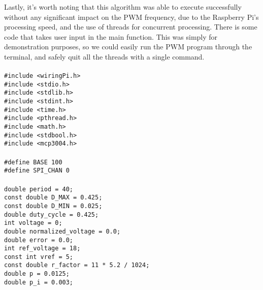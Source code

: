 \documentclass[a4paper, 12pt]{article}
\begin{document}
\begin{appendices}
	Lastly, it's worth noting that this algorithm was able to execute
	successfully without any significant impact on the PWM frequency, due
	to the Raspberry Pi's processing speed, and the use of threads for
	concurrent processing. There is some code that takes user input in the
	main function. This was simply for demonstration purposes, so we could
	easily run the PWM program through the terminal, and safely quit all
	the threads with a single command.\\\\\noindent
	\texttt{\#include <wiringPi.h>} \\\noindent
	\texttt{\#include <stdio.h>} \\\noindent
	\texttt{\#include <stdlib.h>} \\\noindent
	\texttt{\#include <stdint.h>} \\\noindent
	\texttt{\#include <time.h>} \\\noindent
	\texttt{\#include <pthread.h>} \\\noindent
	\texttt{\#include <math.h>} \\\noindent
	\texttt{\#include <stdbool.h>} \\\noindent
	\texttt{\#include <mcp3004.h>} \\\noindent
	\texttt{ \\\noindent}
	\texttt{\#define BASE 100} \\\noindent
	\texttt{\#define SPI\_CHAN 0} \\\noindent
	\texttt{ \\\noindent}
	\texttt{double period = 40;} \\\noindent
	\texttt{const double D\_MAX = 0.425;} \\\noindent
	\texttt{const double D\_MIN = 0.025;} \\\noindent
	\texttt{double duty\_cycle = 0.425;} \\\noindent
	\texttt{int voltage = 0;} \\\noindent
	\texttt{double normalized\_voltage = 0.0;} \\\noindent
	\texttt{double error = 0.0;} \\\noindent
	\texttt{int ref\_voltage = 18;} \\\noindent
	\texttt{const int vref = 5;} \\\noindent
	\texttt{const double r\_factor = 11 * 5.2 / 1024;} \\\noindent
	\texttt{double p = 0.0125;} \\\noindent
	\texttt{double p\_i = 0.003;} \\\noindent

\end{appendices}
\end{document}
